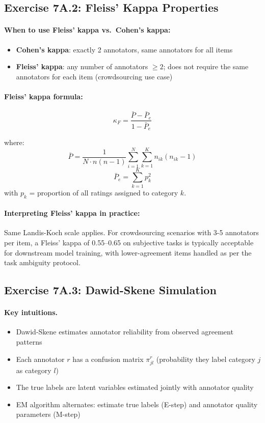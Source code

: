 \subsection{Exercise 7A.2: Fleiss' Kappa Properties}

\paragraph{When to use Fleiss' kappa vs.\ Cohen's kappa:}
\begin{itemize}
    \item \textbf{Cohen's kappa}: exactly 2 annotators, same annotators for all items
    \item \textbf{Fleiss' kappa}: any number of annotators $\geq 2$; does not require the same annotators for each item (crowdsourcing use case)
\end{itemize}

\paragraph{Fleiss' kappa formula:}
\[
\kappa_F = \frac{\bar{P} - \bar{P}_e}{1 - \bar{P}_e}
\]

where:
\[
\bar{P} = \frac{1}{N \cdot n(n-1)} \sum_{i=1}^{N} \sum_{k=1}^{K} n_{ik}(n_{ik} - 1)
\]
\[
\bar{P}_e = \sum_{k=1}^{K} p_k^2
\]
with $p_k$ = proportion of all ratings assigned to category $k$.

\paragraph{Interpreting Fleiss' kappa in practice:} Same Landis-Koch scale applies. For crowdsourcing scenarios with 3-5 annotators per item, a Fleiss' kappa of 0.55--0.65 on subjective tasks is typically acceptable for downstream model training, with lower-agreement items handled as per the task ambiguity protocol.

\subsection{Exercise 7A.3: Dawid-Skene Simulation}

\paragraph{Key intuitions.}
\begin{itemize}
    \item Dawid-Skene estimates annotator reliability from observed agreement patterns
    \item Each annotator $r$ has a confusion matrix $\pi^r_{jl}$ (probability they label category $j$ as category $l$)
    \item The true labels are latent variables estimated jointly with annotator quality
    \item EM algorithm alternates: estimate true labels (E-step) and annotator quality parameters (M-step)
\end{itemize}

